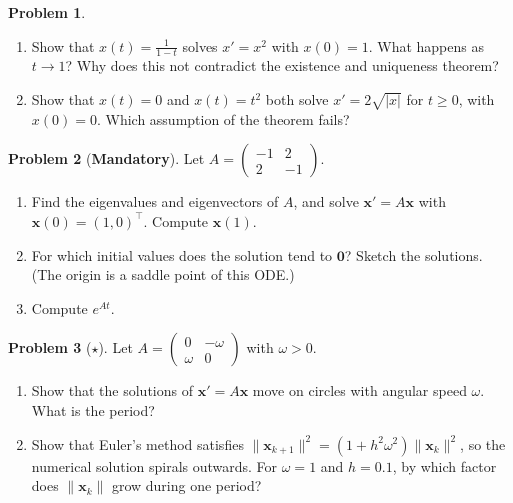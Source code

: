 \documentclass[11pt]{article}
\theoremstyle{definition}
\newtheorem{problem}{Problem}[section]
\newcommand{\mandatory}{\textcolor{red!70!black}{\textbf{Mandatory}}}
\newcommand{\norm}[1]{\lVert #1 \rVert}
\begin{document}
\begin{problem}\label{pr:existence}
    \begin{enumerate}[label=(\alph*)]
        \item Show that $x(t) = \frac{1}{1 - t}$ solves $x' = x^2$ with $x(0) = 1$. What happens as $t \to 1$? Why does this not contradict the existence and uniqueness theorem?
        \item Show that $x(t) = 0$ and $x(t) = t^2$ both solve $x' = 2\sqrt{|x|}$ for $t \geq 0$, with $x(0) = 0$. Which assumption of the theorem fails?
    \end{enumerate}
\end{problem}

\begin{problem}[\mandatory]\label{pr:linear-system}
    Let $A = \begin{pmatrix} -1 & 2 \\ 2 & -1 \end{pmatrix}$.
    \begin{enumerate}[label=(\alph*)]
        \item Find the eigenvalues and eigenvectors of $A$, and solve $\mathbf{x}' = A\mathbf{x}$ with $\mathbf{x}(0) = (1, 0)^\top$. Compute $\mathbf{x}(1)$.
        \item For which initial values does the solution tend to $\mathbf{0}$? Sketch the solutions. (The origin is a saddle point of this ODE.)
        \item Compute $e^{At}$.
    \end{enumerate}
\end{problem}

\begin{problem}[$\star$]\label{pr:rotation-ode}
    Let $A = \begin{pmatrix} 0 & -\omega \\ \omega & 0 \end{pmatrix}$ with $\omega > 0$.
    \begin{enumerate}[label=(\alph*)]
        \item Show that the solutions of $\mathbf{x}' = A\mathbf{x}$ move on circles with angular speed $\omega$. What is the period?
        \item Show that Euler's method satisfies $\norm{\mathbf{x}_{k+1}}^2 = (1 + h^2\omega^2)\norm{\mathbf{x}_k}^2$, so the numerical solution spirals outwards. For $\omega = 1$ and $h = 0.1$, by which factor does $\norm{\mathbf{x}_k}$ grow during one period?
    \end{enumerate}
\end{problem}
\end{document}
